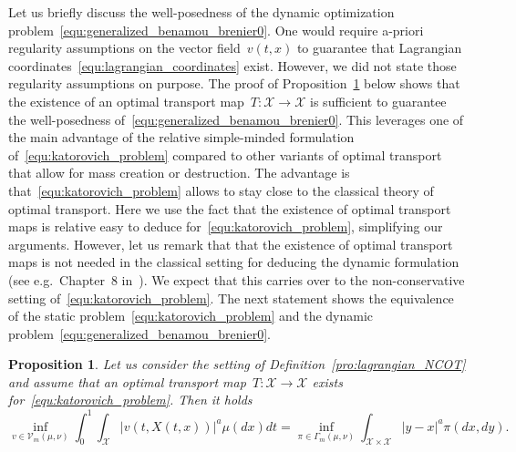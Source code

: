 \documentclass{article}
\newtheorem{proposition}[theorem]{Proposition}
\theoremstyle{definition}
\begin{document}
    Let us briefly discuss the well-posedness of the dynamic optimization problem~\eqref{equ:generalized_benamou_brenier0}. One would require a-priori regularity assumptions on the vector field~$v(t,x)$ to guarantee that Lagrangian coordinates~\eqref{equ:lagrangian_coordinates} exist. However, we did not state those regularity assumptions on purpose. The proof of Proposition~\ref{the:equivalence_dynamic_static} below shows that the existence of an optimal transport map~$T: \mathcal{X} \to \mathcal{X}$ is sufficient to guarantee the well-posedness of~\eqref{equ:generalized_benamou_brenier0}. This leverages one of the main advantage of the relative simple-minded formulation of~\eqref{equ:katorovich_problem} compared to other variants of optimal transport that allow for mass creation or destruction. The advantage is that~\eqref{equ:katorovich_problem} allows to stay close to the classical theory of optimal transport. Here we use the fact that the existence of optimal transport maps is relative easy to deduce for~\eqref{equ:katorovich_problem}, simplifying our arguments. However, let us remark that that the existence of optimal transport maps is not needed in the classical setting for deducing the dynamic formulation (see e.g.~Chapter~8 in~\cite{ambrosio2008gradient}). We expect that this carries over to the non-conservative setting of~\eqref{equ:katorovich_problem}.
    The next statement shows the equivalence of the static problem~\eqref{equ:katorovich_problem} and the dynamic problem~\eqref{equ:generalized_benamou_brenier0}.
\begin{proposition}\label{the:equivalence_dynamic_static}
    Let us consider the setting of Definition~\ref{pro:lagrangian_NCOT} and assume that an optimal transport map~$T: \mathcal{X} \to \mathcal{X}$ exists for~\eqref{equ:katorovich_problem}. Then it holds   
    \begin{equation}\label{equ:generalized_benamou_brenier} 
        \inf_{v \in \mathcal{V}_m(\mu, \nu)}  \int_{0}^1 \int_{\mathcal{X}} |v(t, X(t,x))|^a \mu(dx) dt = \inf_{\pi \in \Gamma_m(\mu,\nu)} \int_{\mathcal{X}\times \mathcal{X}} |y-x|^{a} \pi(dx,dy) .
    \end{equation}   
\end{proposition}
\end{document}
